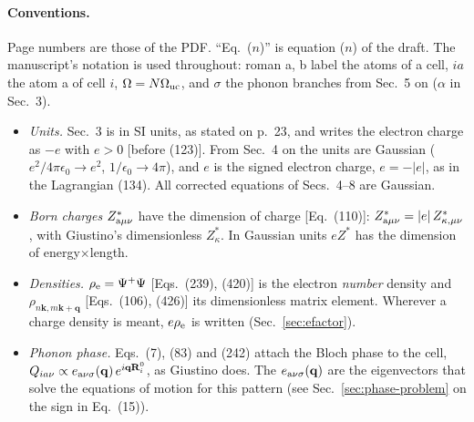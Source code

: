 \documentclass[11pt]{article}
\begin{document}
\paragraph{Conventions.}
Page numbers are those of the PDF. ``Eq.~($n$)'' is equation ($n$) of the draft. The manuscript's
notation is used throughout: roman a, b label the atoms of a cell, $ia$ the atom a of cell $i$,
$\Omega=N\Omega_{\rm uc}$, and $\sigma$ the phonon branches from Sec.~5 on ($\alpha$ in Sec.~3).
\begin{itemize}
\item \emph{Units.} Sec.~3 is in SI units, as stated on p.~23, and writes the electron charge as $-e$
with $e>0$ [before (123)]. From Sec.~4 on the units are Gaussian ($e^2/4\pi\epsilon_0\to e^2$,
$1/\epsilon_0\to4\pi$), and $e$ is the signed electron charge, $e=-|e|$, as in the Lagrangian (134). All
corrected equations of Secs.~4--8 are Gaussian.
\item \emph{Born charges} $Z^*_{{\rm a}\mu\nu}$ have the dimension of charge [Eq.~(110)]:
$Z^*_{{\rm a}\mu\nu}=|e|\,Z^*_{\kappa,\mu\nu}$, with Giustino's dimensionless $Z^*_\kappa$. In Gaussian units
$eZ^*$ has the dimension of energy$\times$length.
\item \emph{Densities.} $\rho_{\rm e}=\Psi^+\Psi$ [Eqs.~(239), (420)] is the electron \emph{number}
density and $\rho_{n\mathbf k,m\mathbf k+\mathbf q}$ [Eqs.~(106), (426)] its dimensionless matrix element.
Wherever a charge density is meant, $e\rho_{\rm e}$ is written (Sec.~\ref{sec:efactor}).
\item \emph{Phonon phase.} Eqs.~(7), (83) and (242) attach the Bloch phase to the cell,
$Q_{ia\nu}\propto e_{{\rm a}\nu\sigma}(\mathbf q)\,e^{i\mathbf q\mathbf R^0_i}$, as Giustino does. The
$e_{{\rm a}\nu\sigma}(\mathbf q)$ are the eigenvectors that solve the equations of motion for this pattern
(see Sec.~\ref{sec:phase-problem} on the sign in Eq.~(15)).
\end{itemize}
\end{document}
